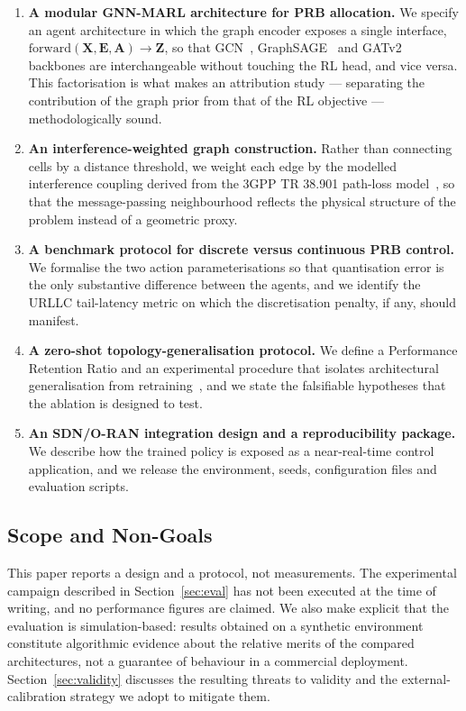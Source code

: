 \documentclass[journal]{IEEEtran}
\begin{document}
\begin{enumerate}
\item \textbf{A modular GNN-MARL architecture for PRB allocation.} We
      specify an agent architecture in which the graph encoder exposes
      a single interface, $\mathrm{forward}(\mathbf{X},\mathbf{E},
      \mathbf{A}) \rightarrow \mathbf{Z}$, so that GCN~\cite{kipf2017gcn},
      GraphSAGE~\cite{hamilton2017graphsage} and
      GATv2~\cite{brody2022gatv2} backbones are interchangeable
      without touching the RL head, and vice versa. This factorisation
      is what makes an attribution study --- separating the
      contribution of the graph prior from that of the RL objective ---
      methodologically sound.
\item \textbf{An interference-weighted graph construction.} Rather than
      connecting cells by a distance threshold, we weight each edge by
      the modelled interference coupling derived from the 3GPP TR 38.901
      path-loss model~\cite{3gpp38901}, so that the message-passing
      neighbourhood reflects the physical structure of the problem
      instead of a geometric proxy.
\item \textbf{A benchmark protocol for discrete versus continuous PRB
      control.} We formalise the two action parameterisations so that
      quantisation error is the only substantive difference between the
      agents, and we identify the URLLC tail-latency metric on which
      the discretisation penalty, if any, should manifest.
\item \textbf{A zero-shot topology-generalisation protocol.} We define
      a Performance Retention Ratio and an experimental procedure that
      isolates architectural generalisation from
      retraining~\cite{kirk2023zeroshot}, and we state the
      falsifiable hypotheses that the ablation is designed to test.
\item \textbf{An SDN/O-RAN integration design and a reproducibility
      package.} We describe how the trained policy is exposed as a
      near-real-time control application, and we release the
      environment, seeds, configuration files and evaluation scripts.
\end{enumerate}

\subsection{Scope and Non-Goals}
This paper reports a design and a protocol, not measurements. The
experimental campaign described in Section~\ref{sec:eval} has not been
executed at the time of writing, and no performance figures are
claimed. We also make explicit that the evaluation is
simulation-based: results obtained on a synthetic environment
constitute algorithmic evidence about the relative merits of the
compared architectures, not a guarantee of behaviour in a commercial
deployment. Section~\ref{sec:validity} discusses the resulting threats
to validity and the external-calibration strategy we adopt to mitigate
them.
\end{document}

